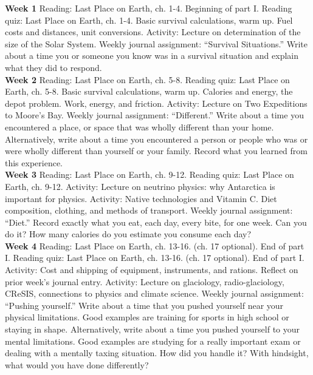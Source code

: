 \documentclass[10pt]{article}
\begin{document}
\begin{outline}[enumerate]
\1 \textbf{Week 1}
\2 Reading: Last Place on Earth, ch. 1-4. Beginning of part I.
\2 Reading quiz: Last Place on Earth, ch. 1-4.
\2 Basic survival calculations, warm up.  Fuel costs and distances, unit conversions.
\2 Activity: Lecture on determination of the size of the Solar System.
\2 Weekly journal assignment: ``Survival Situations.'' Write about a time you or someone you know was in a survival situation and explain what they did to respond. \\
\1\textbf{Week 2}
\2 Reading: Last Place on Earth, ch. 5-8.
\2 Reading quiz: Last Place on Earth, ch. 5-8.
\2 Basic survival calculations, warm up.  Calories and energy, the depot problem.  Work, energy, and friction.
\2 Activity: Lecture on Two Expeditions to Moore's Bay.
\2 Weekly journal assignment: ``Different.''  Write about a time you encountered a place, or space that was wholly different than your home.  Alternatively, write about a time you encountered a person or people who was or were wholly different than yourself or your family.  Record what you learned from this experience. \\
\1 \textbf{Week 3}
\2 Reading: Last Place on Earth, ch. 9-12.
\2 Reading quiz: Last Place on Earth, ch. 9-12.
\2 Activity: Lecture on neutrino physics: why Antarctica is important for physics.
\2 Activity: Native technologies and Vitamin C.  Diet composition, clothing, and methods of transport.
\2 Weekly journal assignment: ``Diet.''  Record exactly what you eat, each day, every bite, for one week.  Can you do it?  How many calories do you estimate you consume each day? \\
\1 \textbf{Week 4}
\2 Reading: Last Place on Earth, ch. 13-16. (ch. 17 optional). End of part I.
\2 Reading quiz: Last Place on Earth, ch. 13-16. (ch. 17 optional). End of part I.
\2 Activity: Cost and shipping of equipment, instruments, and rations.  Reflect on prior week's journal entry.
\2 Activity: Lecture on glaciology, radio-glaciology, CReSIS, connections to physics and climate science.
\2 Weekly journal assignment: ``Pushing yourself.''  Write about a time that you pushed yourself near your physical limitations.  Good examples are training for sports in high school or staying in shape.  Alternatively, write about a time you pushed yourself to your mental limitations.  Good examples are studying for a really important exam or dealing with a mentally taxing situation.  How did you handle it?  With hindsight, what would you have done differently? \\

\end{outline}
\end{document}
